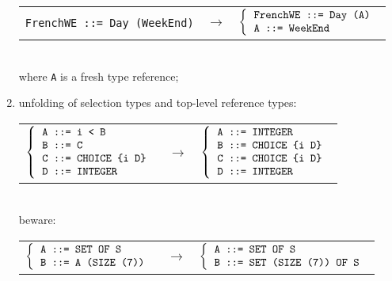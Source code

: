 \begin{enumerate}
        \begin{tabular}{rcl}
           \verb+FrenchWE ::= Day (WeekEnd)+
           & $\longrightarrow$
           & $\left\{
                \begin{tabular}{l}
                   \verb+FrenchWE ::= Day (A)+ \\
                   \verb+A ::= WeekEnd+
                \end{tabular}
              \right.$
        \end{tabular} \\
        where \verb+A+ is a fresh type reference;

  \item unfolding of selection types and top-level reference types:

        \begin{tabular}{rcl} 
          $\left\{
             \begin{tabular}{l}
                \verb+A ::= i < B+\\
                \verb+B ::= C+\\
                \verb+C ::= CHOICE {i D}+\\
                \verb+D ::= INTEGER+
             \end{tabular}
            \right.$
          & $\longrightarrow$
          & $\left\{
               \begin{tabular}{l}
                  \verb+A ::= INTEGER+\\
                  \verb+B ::= CHOICE {i D}+\\
                  \verb+C ::= CHOICE {i D}+\\
                  \verb+D ::= INTEGER+
               \end{tabular}
             \right.$
        \end{tabular} \\
        beware:

        \begin{tabular}{rcl}
          $\left\{
             \begin{tabular}{l}
               \verb+A ::= SET OF S+\\
               \verb+B ::= A (SIZE (7))+
             \end{tabular}
           \right.$
          & $\longrightarrow$
          & $\left\{
             \begin{tabular}{l}
               \verb+A ::= SET OF S+\\ 
               \verb+B ::= SET (SIZE (7)) OF S+
             \end{tabular}
             \right.$
        \end{tabular}


\end{enumerate}
